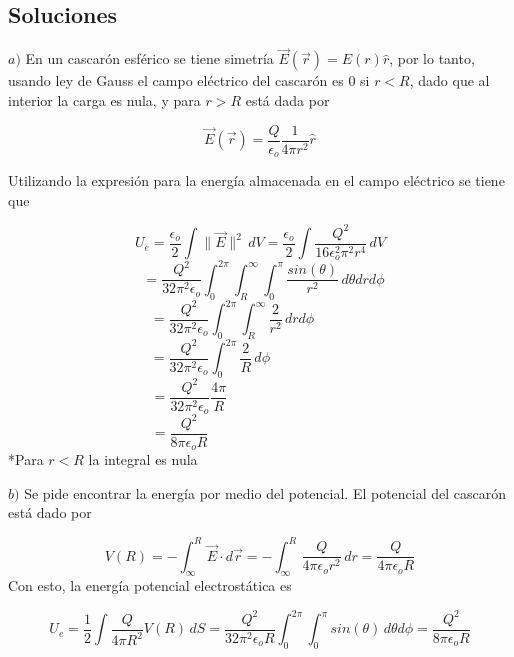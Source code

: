 \subsection{Soluciones}

\newline\newline
$a)$ En un cascarón esférico se tiene simetría $\Vec{E}(\Vec{r}) = E(r)\hat{r}$, por lo tanto, usando ley de Gauss el campo eléctrico del cascarón es 0 si $r<R$, dado que al interior la carga es nula, y para $r>R$ está dada por

\[\Vec{E}(\Vec{r})=\frac{Q}{\epsilon_o}\frac{1}{4\pi r^2}\hat{r}\]

Utilizando la expresión para la energía almacenada en el campo eléctrico se tiene que

\[U_e = \frac{\epsilon_o}{2}\int \parallel\Vec{E}\parallel^2\, dV
= \frac{\epsilon_o}{2}\int \frac{Q^2}{16\epsilon_o^2\pi^2 r^4} \, dV
\]
\[\,\,\,
= \frac{Q^2}{32\pi^2\epsilon_o}\int^{2\pi}_0\int^{\infty}_R\int^\pi_0 \frac{sin(\theta)}{r^2} \, d\theta drd\phi
\]
\[
= \frac{Q^2}{32\pi^2\epsilon_o}\int^{2\pi}_0\int^{\infty}_R \frac{2}{r^2} \, drd\phi
\,\,\,\,\,\,\,\,\,\,\,\,\,\,\,\,\,\,\,\,\,\,\,\,\]
\[
= \frac{Q^2}{32\pi^2\epsilon_o}\int^{2\pi}_0\frac{2}{R}\, d\phi
\,\,\,\,\,\,\,\,\,\,\,\,\,\,\,\,\,\,\,\,\,\,\,\,\,\,\,\,\,\,\,\,\,\,\,\,\,\,\,\,\,\,\,\]
\[
= \frac{Q^2}{32\pi^2\epsilon_o}\frac{4\pi}{R}
\,\,\,\,\,\,\,\,\,\,\,\,\,\,\,\,\,\,\,\,\,\,\,\,\,\,\,\,\,\,\,\,\,\,\,\,\,\,\,\,\,\,\,\,\,\,\,\,\,\,\,\,\,\,\,\,\,\,\,\,\,\]
\[
= \frac{Q^2}{8\pi\epsilon_oR}\,\,\,
\,\,\,\,\,\,\,\,\,\,\,\,\,\,\,\,\,\,\,\,\,\,\,\,\,\,\,\,\,\,\,\,\,\,\,\,\,\,\,\,\,\,\,\,\,\,\,\,\,\,\,\,\,\,\,\,\,\,\,\,\,\,\,\,\,\,\]
\medbreak
*Para $r<R$ la integral es nula
\bigbreak

$b)$ Se pide encontrar la energía por medio del potencial.
\medbreak
El potencial del cascarón está dado por

\[V(R) = -\int^R_\infty\Vec{E}\cdot d\Vec{r}
= -\int^R_\infty\frac{Q}{4\pi\epsilon_o r^2}\,dr
= \frac{Q}{4\pi\epsilon_o R}\]
\medbreak
Con esto, la energía potencial electrostática es

\[U_e = \frac{1}{2}\int\frac{Q}{4\pi R^2}V(R)\,dS
= \frac{Q^2}{32\pi^2\epsilon_o R}\int^{2\pi}_0\int^\pi_0sin(\theta)\,d\theta d\phi
= \frac{Q^2}{8\pi\epsilon_oR}\]


\newpage